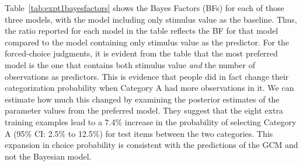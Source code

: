 \documentclass[doc,apacite]{apa6}
\begin{document}
Table~\ref{tab:expt1bayesfactors} shows the Bayes Factors (BFs) for each of those three models, with the model including only stimulus value as the baseline. Thus, the ratio reported for each model in the table reflects the BF for that model compared to the model containing only stimulus value as the predictor.
For the forced-choice judgments, it is evident from the table that the most preferred model is the one that contains both stimulus value {\it and} the number of observations as predictors. This is evidence that people did in fact change their categorization probability when Category A had more observations in it. We can estimate how much this changed by examining the posterior estimates of the parameter values from the preferred model. They suggest that the eight extra training examples lead to a 7.4\% increase in the probability of selecting Category A (95\% CI: 2.5\% to 12.5\%) for test items between the two categories. This expansion in choice probability is consistent with the predictions of the GCM and not the Bayesian model.
\end{document}
